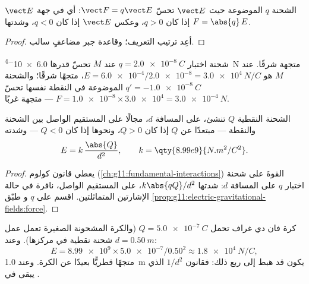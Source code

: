\begin{proposition}\label{prop:g11:electric-gravitational-fields:force}
الشحنة $q$ الموضوعة حيث  $\vect E$ تحسّ 
$\vect F = q \vect E$: أي في جهة $\vect E$ إذا كان $q > 0$، وعكس $\vect E$
إذا كان $q < 0$، وشدتها $F = \abs{q}\,E$.
\end{proposition}

\begin{proof}
أعِد ترتيب التعريف؛ وقاعدة  جبر مضاعفٍ سالب.
\end{proof}

\begin{example}\label{ex:g11:electric-gravitational-fields:reading}
شحنة اختبار $q = \qty{+2.0e-8}{C}$ عند $M$ تحسّ  قدرها
\qty{6.0e-4}{N} متجهة شرقًا.  عند $M$ هو
$E = \num{6.0e-4} / \num{2.0e-8} = \qty{3.0e4}{N/C}$، متجهًا شرقًا؛
والشحنة $q' = \qty{-1.0e-8}{C}$ الموضوعة في النقطة نفسها تحسّ
$F = \num{1.0e-8} \times \num{3.0e4} = \qty{3.0e-4}{N}$ --- متجهة غربًا.
\end{example}

\begin{proposition}\label{prop:g11:electric-gravitational-fields:point}
الشحنة النقطية $Q$ تنشئ، على المسافة $d$، مجالًا على المستقيم
الواصل بين الشحنة والنقطة --- مبتعدًا عن $Q$ إذا كان $Q > 0$، ونحوها إذا كان
$Q < 0$ --- وشدته
\[
E = k\,\frac{\abs{Q}}{d^2},
\qquad k = \qty{8.99e9}{N.m^2/C^2}.
\]
\end{proposition}

\begin{proof}
يعطي قانون كولوم (\cref{ch:g11:fundamental-interactions}) القوةَ
على شحنة اختبار $q$ على المسافة $d$: شدتها $k \abs{qQ} / d^2$،
على المستقيم الواصل، نافرة في حالة الإشارتين المتماثلتين. اقسم على $q$ و
طبّق \cref{prop:g11:electric-gravitational-fields:force}.
\end{proof}

\begin{example}\label{ex:g11:electric-gravitational-fields:sphere}
كرة فان دي غراف تحمل $Q = \qty{+5.0e-7}{C}$ (والكرة المشحونة الصغيرة
تعمل عمل شحنة نقطية في مركزها). وعند $d = \qty{0.50}{m}$:
\[
E = \num{8.99e9} \times \num{5.0e-7} / 0.50^2 \approx \qty{1.8e4}{N/C},
\]
متجهًا قطريًّا بعيدًا عن الكرة. وعند \qty{1.0}{m} يكون قد هبط
إلى ربع ذلك: فقانون $1/d^2$ الذي  يبقى في .
\end{example}

